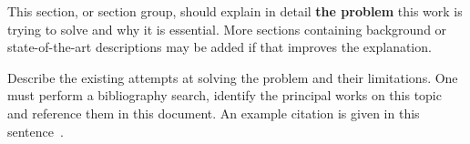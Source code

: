 This section, or section group, should explain in detail {\bf the problem} this
work is trying to solve and why it is essential. More sections containing
background or state-of-the-art descriptions may be added if that improves the
explanation.

Describe the existing attempts at solving the problem and their limitations. One
must perform a bibliography search, identify the principal works on this topic
and reference them in this document. An example citation is given in this
sentence~\cite{Lopes2017}.
